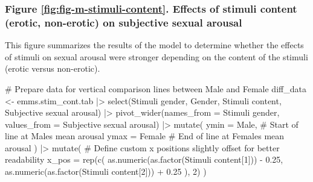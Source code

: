 \documentclass[
  bookmarksnumbered]{article}
\newenvironment{Shaded}{\begin{snugshade}}{\end{snugshade}}
\newcommand{\AttributeTok}[1]{\textcolor[rgb]{0.80,0.80,0.80}{#1}}
\newcommand{\CommentTok}[1]{\textcolor[rgb]{0.50,0.62,0.50}{#1}}
\newcommand{\DecValTok}[1]{\textcolor[rgb]{0.86,0.86,0.80}{#1}}
\newcommand{\FloatTok}[1]{\textcolor[rgb]{0.75,0.75,0.82}{#1}}
\newcommand{\FunctionTok}[1]{\textcolor[rgb]{0.94,0.94,0.56}{#1}}
\newcommand{\NormalTok}[1]{\textcolor[rgb]{0.80,0.80,0.80}{#1}}
\newcommand{\OtherTok}[1]{\textcolor[rgb]{0.94,0.94,0.56}{#1}}
\newcommand{\SpecialCharTok}[1]{\textcolor[rgb]{0.86,0.64,0.64}{#1}}
\newcommand{\StringTok}[1]{\textcolor[rgb]{0.80,0.58,0.58}{#1}}
\begin{document}
\subsubsection{Figure \ref{fig:fig-m-stimuli-content}. Effects of stimuli content (erotic, non-erotic) on subjective sexual arousal}\label{figure-reffigfig-m-stimuli-content.-effects-of-stimuli-content-erotic-non-erotic-on-subjective-sexual-arousal}

This figure summarizes the results of the model to determine whether the effects of stimuli on sexual arousal were stronger depending on the content of the stimuli (erotic versus non-erotic).

\begin{Shaded}
\begin{Highlighting}[]
\CommentTok{\# Prepare data for vertical comparison lines between Male and Female}
\NormalTok{diff\_data }\OtherTok{\textless{}{-}}\NormalTok{ emms.stim\_cont.tab }\SpecialCharTok{|\textgreater{}}
  \FunctionTok{select}\NormalTok{(}\StringTok{\textasciigrave{}}\AttributeTok{Stimuli gender}\StringTok{\textasciigrave{}}\NormalTok{, Gender, }\StringTok{\textasciigrave{}}\AttributeTok{Stimuli content}\StringTok{\textasciigrave{}}\NormalTok{, }\StringTok{\textasciigrave{}}\AttributeTok{Subjective sexual arousal}\StringTok{\textasciigrave{}}\NormalTok{) }\SpecialCharTok{|\textgreater{}}
  \FunctionTok{pivot\_wider}\NormalTok{(}\AttributeTok{names\_from =} \StringTok{\textasciigrave{}}\AttributeTok{Stimuli gender}\StringTok{\textasciigrave{}}\NormalTok{, }\AttributeTok{values\_from =} \StringTok{\textasciigrave{}}\AttributeTok{Subjective sexual arousal}\StringTok{\textasciigrave{}}\NormalTok{) }\SpecialCharTok{|\textgreater{}}
  \FunctionTok{mutate}\NormalTok{(}
    \AttributeTok{ymin =}\NormalTok{ Male, }\CommentTok{\# Start of line at Male\textquotesingle{}s mean arousal}
    \AttributeTok{ymax =}\NormalTok{ Female }\CommentTok{\# End of line at Female\textquotesingle{}s mean arousal}
\NormalTok{  ) }\SpecialCharTok{|\textgreater{}}
  \FunctionTok{mutate}\NormalTok{(}
    \CommentTok{\# Define custom x positions slightly offset for better readability}
    \AttributeTok{x\_pos =} \FunctionTok{rep}\NormalTok{(}\FunctionTok{c}\NormalTok{(}
      \FunctionTok{as.numeric}\NormalTok{(}\FunctionTok{as.factor}\NormalTok{(}\StringTok{\textasciigrave{}}\AttributeTok{Stimuli content}\StringTok{\textasciigrave{}}\NormalTok{[}\DecValTok{1}\NormalTok{])) }\SpecialCharTok{{-}} \FloatTok{0.25}\NormalTok{,}
      \FunctionTok{as.numeric}\NormalTok{(}\FunctionTok{as.factor}\NormalTok{(}\StringTok{\textasciigrave{}}\AttributeTok{Stimuli content}\StringTok{\textasciigrave{}}\NormalTok{[}\DecValTok{2}\NormalTok{])) }\SpecialCharTok{+} \FloatTok{0.25}
\NormalTok{    ), }\DecValTok{2}\NormalTok{)}
\NormalTok{  )}


\end{Highlighting}
\end{Shaded}
\end{document}
